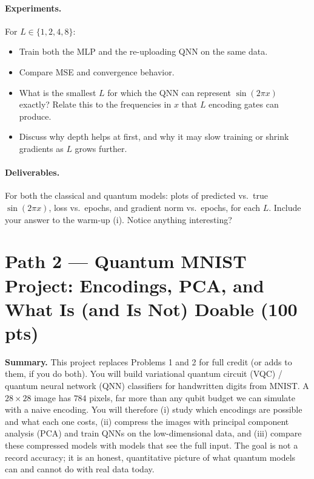 \documentclass[11pt]{article}
\newenvironment{summary}{\par\noindent\textbf{Summary.} }{\par}
\begin{document}
\paragraph{Experiments.}
For $L\in\{1,2,4,8\}$:
\begin{itemize}
\item Train both the MLP and the re-uploading QNN on the same data.
\item Compare MSE and convergence behavior.
\item What is the smallest $L$ for which the QNN can represent $\sin(2\pi x)$ exactly? Relate this to the frequencies in $x$ that $L$ encoding gates can produce.
\item Discuss why depth helps at first, and why it may slow training or shrink gradients as $L$ grows further.
\end{itemize}

\paragraph{Deliverables.}
For both the classical and quantum models: plots of predicted vs.\ true $\sin(2\pi x)$, loss vs.\ epochs, and gradient norm vs.\ epochs, for each $L$. Include your answer to the warm-up (i). Notice anything interesting? \smiley{}

\newpage
\section*{Path 2 — Quantum MNIST Project: Encodings, PCA, and What Is (and Is Not) Doable (100 pts)}

\begin{summary}
This project replaces Problems 1 and 2 for full credit (or adds to them, if you do both). You will build variational quantum circuit (VQC) / quantum neural network (QNN) classifiers for handwritten digits from MNIST. A $28\times28$ image has $784$ pixels, far more than any qubit budget we can simulate with a naive encoding. You will therefore (i) study which encodings are possible and what each one costs, (ii) compress the images with principal component analysis (PCA) and train QNNs on the low-dimensional data, and (iii) compare these compressed models with models that see the full input. The goal is not a record accuracy; it is an honest, quantitative picture of what quantum models can and cannot do with real data today.
\end{summary}
\end{document}
